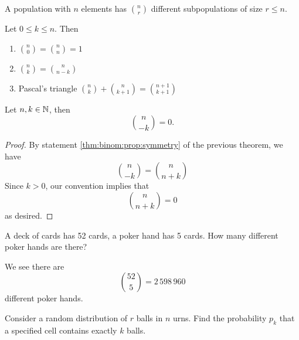 A population with $n$ elements has $\binom{n}{r}$ different
subpopulations of size $r\leq n$.

\label{thm:propertiesOfBinomialCoefficients}
Let $0\leq k\leq n$. Then
\begin{enumerate}
\item $\displaystyle\binom{n}{0}=\binom{n}{n}=1$
\item\label{thm:binom:prop:symmetry} $\displaystyle\binom{n}{k}=\binom{n}{n-k}$
\item Pascal's triangle $\displaystyle\binom{n}{k}+\binom{n}{k+1}=\binom{n+1}{k+1}$
\end{enumerate}

\begin{cor}
Let $n,k\in\mathbb{N}$, then
\begin{equation}
\binom{n}{-k}=0.
\end{equation}
\end{cor}
\begin{proof}
By statement \ref{thm:binom:prop:symmetry} of the previous theorem, we
have
\begin{equation}
\binom{n}{-k}=\binom{n}{n+k}
\end{equation}
Since $k>0$, our convention implies that
\begin{equation}
\binom{n}{n+k}=0
\end{equation}
as desired.
\end{proof}



A deck of cards has 52 cards, a poker hand has 5 cards.
How many different poker hands are there?

We see there are
\begin{equation}
\binom{52}{5}=2\,598\,960
\end{equation}
different poker hands.

Consider a random distribution of $r$ balls in $n$ urns. Find the
probability $p_{k}$ that a specified cell contains exactly $k$ balls.

